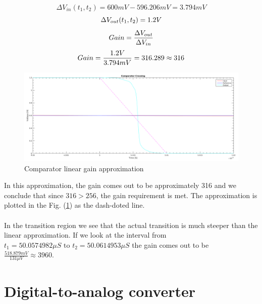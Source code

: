 \documentclass[english, 12pt, a4paper]{ifimaster}
\begin{document}
\begin{equation}
 \Delta V_{in}(t_1, t_2) = 600mV - 596.206mV = 3.794mV 
 \end{equation}
 \begin{equation}
 \Delta V_{out}(t_1, t_2) = 1.2V \\
 \end{equation}
 \begin{equation}
 Gain = \frac{\Delta V_{out}}{\Delta V_{in}}\\
 \end{equation}
 \begin{equation}
 Gain = \frac{1.2V}{3.794mV} = 316.289 \approx 316 \\
\end{equation}
\begin{figure}[!ht]
    \centering
    \includegraphics[width=\textwidth]{img/comparator/comparator_crossing_full_with_linear_approx}
    \caption{Comparator linear gain approximation}
    \label{figure:comparator:comparator_linear_approx}
\end{figure}
\noindent
In this approximation, the gain comes out to be approximately 316 and we conclude that since \( 316 > 256 \), the gain requirement is met. 
The approximation is plotted in the Fig. (\ref{figure:comparator:comparator_linear_approx}) as the dash-doted line.\\
\\
In the transition region we see that the actual transition is much steeper than the linear approximation. 
If we look at the interval from \(t_1 = 50.0574982\mu S \textrm{ to } t_2 = 50.0614953\mu S\) the gain comes out to be \(\frac{518.879mV}{131\mu V} \approx 3960\). 

\section{Digital-to-analog converter}
\end{document}
